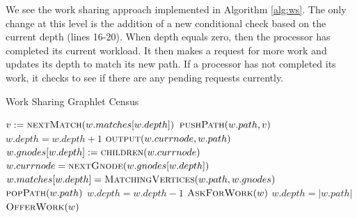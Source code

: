 \documentclass[12pt,twoside]{reedthesis}
\begin{document}
We see the work sharing approach implemented in Algorithm \ref{alg:ws}. The only change at this level is the addition of a new conditional check based on the current depth (lines 16-20). When depth equals zero, then the  processor has completed its current workload. It then makes a request for more work and updates its depth to match its new path. If a processor has not completed its work, it checks to see if there are any pending requests currently. 

\begin{algorithm}
\caption{Work Sharing Graphlet Census}\label{alg:ws}
\begin{algorithmic}[1]
            \State$v := \Call{nextMatch}{w.matches[w.depth]} $
            \State $\Call{pushPath}{w.path,v}$
            \State $w.depth = w.depth + 1$
                \State $\Call{output}{w.currnode, w.path}$
            \EndIf
            \State $w.gnodes[w.depth] :=  \Call{children}{w.currnode}$
            \State $w.currnode = \Call{nextGnode}{w.gnodes[w.depth]}$
            \State $w.matches[w.depth] =   \Call{MatchingVertices}{w.path,w.gnodes} $
        \Else
            \State $\Call{popPath}{w.path}$
            \State $w.depth = w.depth - 1$
        \EndIf
            \State $\Call{AskForWork}{w}$
            \State $w.depth = |w.path|$
        \Else
            \State $\Call{OfferWork}{w}$
        \EndIf
    \EndWhile
\EndProcedure
\end{algorithmic}
\end{algorithm}





\end{document}
